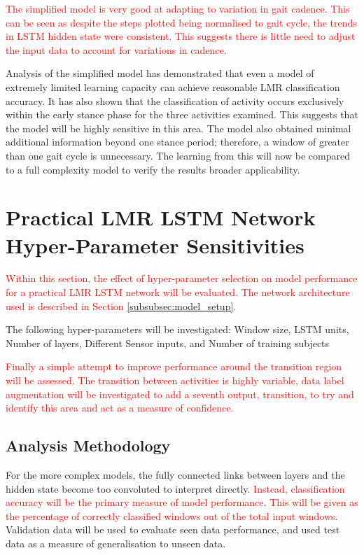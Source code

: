 \documentclass[sensors,article,submit,moreauthors,pdftex]{Definitions/mdpi}
\begin{document}
\textcolor{red}{The simplified model is very good at adapting to variation in gait cadence. This can be seen as despite the steps plotted being normalised to gait cycle, the trends in LSTM hidden state were consistent. This suggests there is little need to adjust the input data to account for variations in cadence.}

Analysis of the simplified model has demonstrated that even a model of extremely limited learning capacity can achieve reasonable LMR classification accuracy. It has also shown that the classification of activity occurs exclusively within the early stance phase for the three activities examined. This suggests that the model will be highly sensitive in this area. The model also obtained minimal additional information beyond one stance period; therefore, a window of greater than one gait cycle is unnecessary. The learning from this will now be compared to a full complexity model to verify the results broader applicability.


\section{Practical LMR LSTM Network Hyper-Parameter Sensitivities}
\label{sec:full_complexity}
\textcolor{red}{Within this section, the effect of hyper-parameter selection on model performance for a practical LMR LSTM network will be evaluated. The network architecture used is described in Section \ref{subsubsec:model_setup}.}

The following hyper-parameters will be investigated: Window size, LSTM units, Number of layers, Different Sensor inputs, and Number of training subjects

\textcolor{red}{Finally a simple attempt to improve performance around the transition region will be assessed. The transition between activities is highly variable, data label augmentation will be investigated to add a seventh output, transition, to try and identify this area and act as a measure of confidence.}

\subsection{Analysis Methodology}
For the more complex models, the fully connected links between layers and the hidden state become too convoluted to interpret directly. \textcolor{red}{Instead, classification accuracy will be the primary measure of model performance. This will be given as the percentage of correctly classified windows out of the total input windows.} Validation data will be used to evaluate seen data performance, and used test data as a measure of generalisation to unseen data. 
\end{document}
